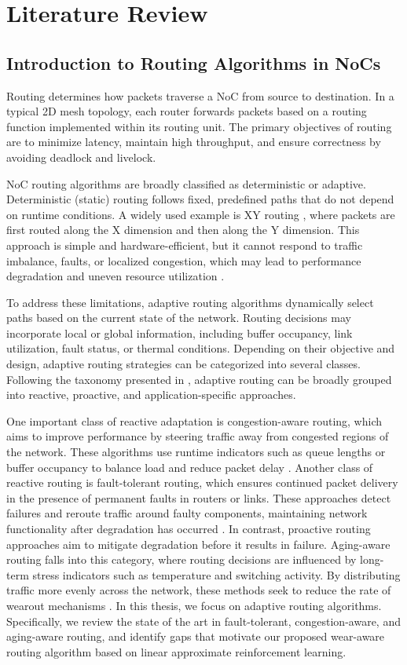 \chapter{Literature Review}

\section{Introduction to Routing Algorithms in NoCs}

Routing determines how packets traverse a NoC from source to destination. In a typical 2D mesh topology, each router forwards packets based on a routing function implemented within its routing unit. The primary objectives of routing are to minimize latency, maintain high throughput, and ensure correctness by avoiding deadlock and livelock.

NoC routing algorithms are broadly classified as deterministic or adaptive. Deterministic (static) routing follows fixed, predefined paths that do not depend on runtime conditions. A widely used example is XY routing \cite{Chawade2012}, where packets are first routed along the X dimension and then along the Y dimension. This approach is simple and hardware-efficient, but it cannot respond to traffic imbalance, faults, or localized congestion, which may lead to performance degradation and uneven resource utilization \cite{AROMa2018}.

To address these limitations, adaptive routing algorithms dynamically select paths based on the current state of the network. Routing decisions may incorporate local or global information, including buffer occupancy, link utilization, fault status, or thermal conditions. Depending on their objective and design, adaptive routing strategies can be categorized into several classes. Following the taxonomy presented in \cite{Kondoth2026}, adaptive routing can be broadly grouped into reactive, proactive, and application-specific approaches.

One important class of reactive adaptation is congestion-aware routing, which aims to improve performance by steering traffic away from congested regions of the network. These algorithms use runtime indicators such as queue lengths or buffer occupancy to balance load and reduce packet delay \cite{Kondoth2026}. Another class of reactive routing is fault-tolerant routing, which ensures continued packet delivery in the presence of permanent faults in routers or links. These approaches detect failures and reroute traffic around faulty components, maintaining network functionality after degradation has occurred \cite{Kondoth2026}. In contrast, proactive routing approaches aim to mitigate degradation before it results in failure. Aging-aware routing falls into this category, where routing decisions are influenced by long-term stress indicators such as temperature and switching activity. By distributing traffic more evenly across the network, these methods seek to reduce the rate of wearout mechanisms \cite{Kondoth2026}. In this thesis, we focus on adaptive routing algorithms. Specifically, we review the state of the art in fault-tolerant, congestion-aware, and aging-aware routing, and identify gaps that motivate our proposed wear-aware routing algorithm based on linear approximate reinforcement learning.

